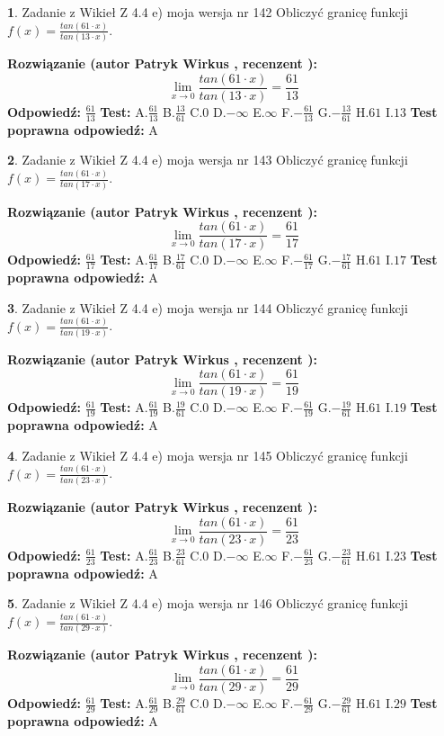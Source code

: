 \documentclass[12pt, a4paper]{article}
\theoremstyle{definition} %
\newtheorem{zad}{}
\newcommand{\zadStart}[1]{\begin{zad}#1\newline}
\newcommand{\zadStop}{\end{zad}}
\newcommand{\rozwStart}[2]{\noindent \textbf{Rozwiązanie (autor #1 , recenzent #2): }\newline}
\newcommand{\rozwStop}{\newline}
\newcommand{\odpStart}{\noindent \textbf{Odpowiedź:}\newline}
\newcommand{\odpStop}{\newline}
\newcommand{\testStart}{\noindent \textbf{Test:}\newline}
\newcommand{\testStop}{\newline}
\newcommand{\kluczStart}{\noindent \textbf{Test poprawna odpowiedź:}\newline}
\newcommand{\kluczStop}{\newline}
\begin{document}
\zadStart{Zadanie z Wikieł Z 4.4 e) moja wersja nr 142}
Obliczyć granicę funkcji $f(x)=\frac{tan(61\cdot x)}{tan(13\cdot x)}$.
\zadStop
\rozwStart{Patryk Wirkus}{}
$$\lim\limits_{x\to 0}\frac{tan(61\cdot x)}{tan(13\cdot x)}=
\frac{61}{13}$$
\rozwStop
\odpStart
$\frac{61}{13}$
\odpStop
\testStart
A.$\frac{61}{13}$
B.$\frac{13}{61}$
C.$0$
D.$-\infty$
E.$\infty$
F.$-\frac{61}{13}$
G.$-\frac{13}{61}$
H.$61$
I.$13$
\testStop
\kluczStart
A
\kluczStop



\zadStart{Zadanie z Wikieł Z 4.4 e) moja wersja nr 143}
Obliczyć granicę funkcji $f(x)=\frac{tan(61\cdot x)}{tan(17\cdot x)}$.
\zadStop
\rozwStart{Patryk Wirkus}{}
$$\lim\limits_{x\to 0}\frac{tan(61\cdot x)}{tan(17\cdot x)}=
\frac{61}{17}$$
\rozwStop
\odpStart
$\frac{61}{17}$
\odpStop
\testStart
A.$\frac{61}{17}$
B.$\frac{17}{61}$
C.$0$
D.$-\infty$
E.$\infty$
F.$-\frac{61}{17}$
G.$-\frac{17}{61}$
H.$61$
I.$17$
\testStop
\kluczStart
A
\kluczStop



\zadStart{Zadanie z Wikieł Z 4.4 e) moja wersja nr 144}
Obliczyć granicę funkcji $f(x)=\frac{tan(61\cdot x)}{tan(19\cdot x)}$.
\zadStop
\rozwStart{Patryk Wirkus}{}
$$\lim\limits_{x\to 0}\frac{tan(61\cdot x)}{tan(19\cdot x)}=
\frac{61}{19}$$
\rozwStop
\odpStart
$\frac{61}{19}$
\odpStop
\testStart
A.$\frac{61}{19}$
B.$\frac{19}{61}$
C.$0$
D.$-\infty$
E.$\infty$
F.$-\frac{61}{19}$
G.$-\frac{19}{61}$
H.$61$
I.$19$
\testStop
\kluczStart
A
\kluczStop



\zadStart{Zadanie z Wikieł Z 4.4 e) moja wersja nr 145}
Obliczyć granicę funkcji $f(x)=\frac{tan(61\cdot x)}{tan(23\cdot x)}$.
\zadStop
\rozwStart{Patryk Wirkus}{}
$$\lim\limits_{x\to 0}\frac{tan(61\cdot x)}{tan(23\cdot x)}=
\frac{61}{23}$$
\rozwStop
\odpStart
$\frac{61}{23}$
\odpStop
\testStart
A.$\frac{61}{23}$
B.$\frac{23}{61}$
C.$0$
D.$-\infty$
E.$\infty$
F.$-\frac{61}{23}$
G.$-\frac{23}{61}$
H.$61$
I.$23$
\testStop
\kluczStart
A
\kluczStop



\zadStart{Zadanie z Wikieł Z 4.4 e) moja wersja nr 146}
Obliczyć granicę funkcji $f(x)=\frac{tan(61\cdot x)}{tan(29\cdot x)}$.
\zadStop
\rozwStart{Patryk Wirkus}{}
$$\lim\limits_{x\to 0}\frac{tan(61\cdot x)}{tan(29\cdot x)}=
\frac{61}{29}$$
\rozwStop
\odpStart
$\frac{61}{29}$
\odpStop
\testStart
A.$\frac{61}{29}$
B.$\frac{29}{61}$
C.$0$
D.$-\infty$
E.$\infty$
F.$-\frac{61}{29}$
G.$-\frac{29}{61}$
H.$61$
I.$29$
\testStop
\kluczStart
A
\kluczStop
\end{document}
